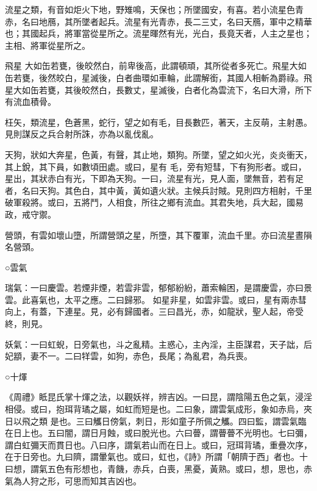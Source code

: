 \begin{pinyinscope}
 流星之類，有音如炬火下地，野雉鳴，天保也；所墜國安，有喜。若小流星色青赤，名曰地鴈，其所墜者起兵。流星有光青赤，長二三丈，名曰天鴈，軍中之精華也；其國起兵，將軍當從星所之。流星暉然有光，光白，長竟天者，人主之星也；主相、將軍從星所之。



 飛星
 大如缶若甕，後皎然白，前卑後高，此謂頓頑，其所從者多死亡。飛星大如缶若甕，後然皎白，星滅後，白者曲環如車輪，此謂解銜，其國人相斬為爵祿。飛星大如缶若甕，其後皎然白，長數丈，星滅後，白者化為雲流下，名曰大滑，所下有流血積骨。



 枉矢，類流星，色蒼黑，蛇行，望之如有毛，目長數匹，著天，主反萌，主射愚。見則謀反之兵合射所誅，亦為以亂伐亂。



 天狗，狀如大奔星，色黃，有聲，其止地，類狗。所墜，望之如火光，炎炎衝天，其上銳，其下員，如數頃田處。或曰，星有
 毛，旁有短彗，下有狗形者。或曰，星出，其狀赤白有光，下即為天狗。一曰，流星有光，見人面，墜無音，若有足者，名曰天狗。其色白，其中黃，黃如遺火狀。主候兵討賊。見則四方相射，千里破軍殺將。或曰，五將鬥，人相食，所往之鄉有流血。其君失地，兵大起，國易政，戒守禦。



 營頭，有雲如壞山墮，所謂營頭之星，所墮，其下覆軍，流血千里。亦曰流星晝隕名營頭。



 ○雲氣



 瑞氣：一曰慶雲。若煙非煙，若雲非雲，郁郁紛紛，蕭索輪困，是謂慶雲，亦曰景雲。此喜氣也，太平之應。二曰歸邪。
 如星非星，如雲非雲。或曰，星有兩赤彗向上，有蓋，下連星。見，必有歸國者。三曰昌光，赤，如龍狀，聖人起，帝受終，則見。



 妖氣：一曰虹蜺，日旁氣也，斗之亂精。主惑心，主內淫，主臣謀君，天子詘，后妃顓，妻不一。二曰䍧雲，如狗，赤色，長尾；為亂君，為兵喪。



 ○十煇



 《周禮》眡昆氏掌十煇之法，以觀妖祥，辨吉凶。一曰昆，謂陰陽五色之氣，浸淫相侵。或曰，抱珥背璚之屬，如虹而短是也。二曰象，謂雲氣成形，象如赤烏，夾日以飛之類
 是也。三曰觿日傍氣，刺日，形如童子所佩之觿。四曰監，謂雲氣臨在日上也。五曰闇，謂日月蝕，或曰脫光也。六曰瞢，謂瞢瞢不光明也。七曰彌，謂白虹彌天而貫日也。八曰序，謂氣若山而在日上。或曰，冠珥背璚，重疊次序，在于日旁也。九曰隮，謂暈氣也。或曰，虹也，《詩》所謂「朝隮于西」者也。十曰想，謂氣五色有形想也，青饑，赤兵，白喪，黑憂，黃熟。或曰，想，思也，赤氣為人狩之形，可思而知其吉凶也。




\end{pinyinscope}
